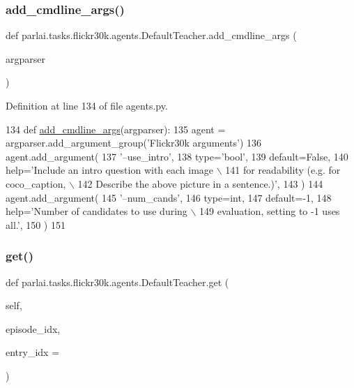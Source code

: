 \subsubsection{\texorpdfstring{add\+\_\+cmdline\+\_\+args()}{add\_cmdline\_args()}}
{\footnotesize\ttfamily def parlai.\+tasks.\+flickr30k.\+agents.\+Default\+Teacher.\+add\+\_\+cmdline\+\_\+args (\begin{DoxyParamCaption}\item[{}]{argparser }\end{DoxyParamCaption})\hspace{0.3cm}{\ttfamily [static]}}



Definition at line 134 of file agents.\+py.


\begin{DoxyCode}
134     \textcolor{keyword}{def }\hyperlink{namespaceparlai_1_1agents_1_1drqa_1_1config_a62fdd5554f1da6be0cba185271058320}{add\_cmdline\_args}(argparser):
135         agent = argparser.add\_argument\_group(\textcolor{stringliteral}{'Flickr30k arguments'})
136         agent.add\_argument(
137             \textcolor{stringliteral}{'--use\_intro'},
138             type=\textcolor{stringliteral}{'bool'},
139             default=\textcolor{keyword}{False},
140             help=\textcolor{stringliteral}{'Include an intro question with each image \(\backslash\)}
141 \textcolor{stringliteral}{                                for readability (e.g. for coco\_caption, \(\backslash\)}
142 \textcolor{stringliteral}{                                Describe the above picture in a sentence.)'},
143         )
144         agent.add\_argument(
145             \textcolor{stringliteral}{'--num\_cands'},
146             type=int,
147             default=-1,
148             help=\textcolor{stringliteral}{'Number of candidates to use during \(\backslash\)}
149 \textcolor{stringliteral}{                                evaluation, setting to -1 uses all.'},
150         )
151 
\end{DoxyCode}
\mbox{\label{classparlai_1_1tasks_1_1flickr30k_1_1agents_1_1DefaultTeacher_a55dc5ed3f7e99ad143248a9fba87e2b2}} 
\subsubsection{\texorpdfstring{get()}{get()}}
{\footnotesize\ttfamily def parlai.\+tasks.\+flickr30k.\+agents.\+Default\+Teacher.\+get (\begin{DoxyParamCaption}\item[{}]{self,  }\item[{}]{episode\+\_\+idx,  }\item[{}]{entry\+\_\+idx = {} }\end{DoxyParamCaption})}



